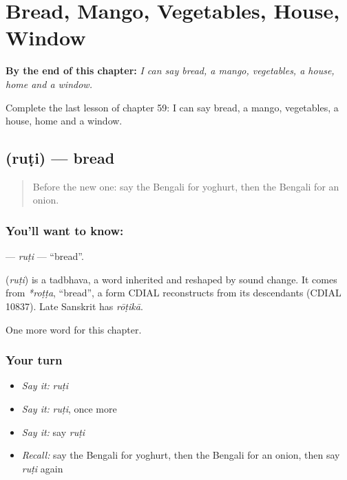 
\chapter{Bread, Mango, Vegetables, House, Window}
\label{ch:bn-bread-mango-vegetables-house-window}

\begin{chapteropening}
\textbf{By the end of this chapter:} \emph{I can say bread, a mango, vegetables, a house, home and a window.}

Complete the last lesson of chapter 59: I can say bread, a mango, vegetables, a house, home and a window.
\end{chapteropening}

\section[\texorpdfstring{\bn{রুটি} (ruṭi)}{রুটি (ruṭi)}]{ (ruṭi) — bread}

\label{lesson:BN-C59-ruti}



\begin{quote}
Before the new one: say the Bengali for yoghurt, then the Bengali for an onion.
\end{quote}

\subsection*{You'll want to know: }
\textbf{} — \emph{ruṭi} — \textquotedblleft{}bread\textquotedblright{}.

\begin{cousinweb}
\textbf{} (\emph{ruṭi}) is a tadbhava, a word inherited and reshaped by sound change. It comes from \emph{*roṭṭa}, \textquotedblleft{}bread\textquotedblright{}, a form CDIAL reconstructs from its descendants (CDIAL 10837). Late Sanskrit has \emph{rōṭikā}.
\end{cousinweb}

\begin{grammarlens}[title={What you've built}]
One more word for this chapter.
\end{grammarlens}

\subsection*{Your turn}
\begin{itemize}
\raggedright
  \item \emph{Say it:} \emph{ruṭi}
  \item \emph{Say it:} \emph{ruṭi}, once more
  \item \emph{Say it:} say \emph{ruṭi}
  \item \emph{Recall:} say the Bengali for yoghurt, then the Bengali for an onion, then say \emph{ruṭi} again
\end{itemize}

